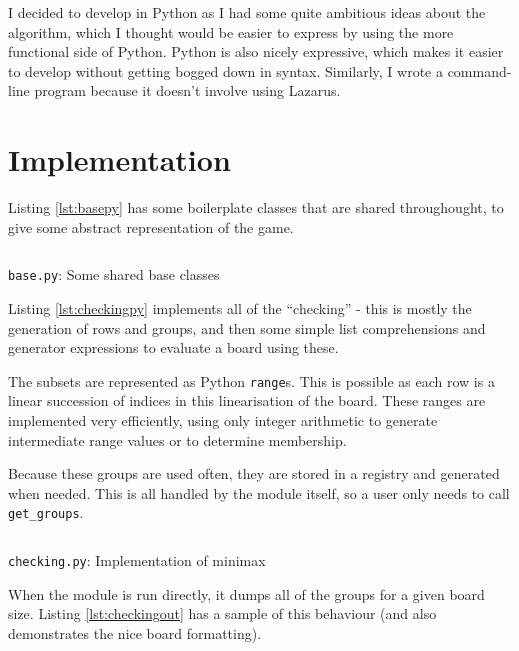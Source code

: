 \documentclass[a4paper,11pt]{article}
\newenvironment{longlisting}
{\addvspace{\baselineskip}\captionsetup{type=listing}}
{\addvspace{\baselineskip}}
\begin{document}
    I decided to develop in Python as I had some quite ambitious ideas about the
    algorithm, which I thought would be easier to express by using the more
    functional side of Python. Python is also nicely expressive, which makes it
    easier to develop without getting bogged down in syntax. Similarly, I wrote
    a command-line program because it doesn't involve using Lazarus.

    \section{Implementation}

    Listing \ref{lst:basepy} has some boilerplate classes that are shared
    throughought, to give some abstract representation of the game.

\begin{longlisting}
\inputminted{python}{../src/base.py}
\caption{\texttt{base.py}: Some shared base classes}
\label{lst:basepy}
\end{longlisting}

    Listing \ref{lst:checkingpy} implements all of the ``checking'' - this is
    mostly the generation of rows and groups, and then some simple list
    comprehensions and generator expressions to evaluate a board using these.

    The subsets are represented as Python \texttt{range}s. This is possible as
    each row is a linear succession of indices in this linearisation of the
    board. These ranges are implemented very efficiently, using only integer
    arithmetic to generate intermediate range values or to determine membership.

    Because these groups are used often, they are stored in a registry and
    generated when needed. This is all handled by the module itself, so a user
    only needs to call \texttt{get\_groups}.

\begin{longlisting}
\inputminted{python}{../src/checking.py}
\caption{\texttt{checking.py}: Implementation of minimax}
\label{lst:checkingpy}
\end{longlisting}

    When the module is run directly, it dumps all of the groups for a given
    board size. Listing \ref{lst:checkingout} has a sample of this behaviour
    (and also demonstrates the nice board formatting).
\end{document}
